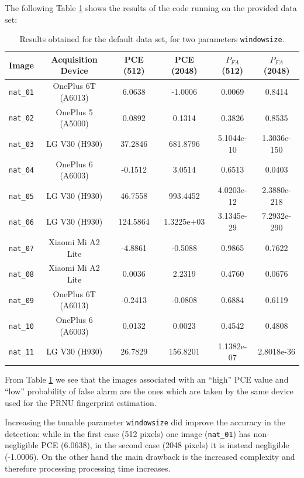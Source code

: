 \documentclass[a4paper, 11pt]{article}
\begin{document}
The following Table \ref{tab:defaultdataset} shows the results of the code running on the provided data set:
\begin{table}[H]
	\centering

	\begin{tabular}{c|c|c|c|c|c}
	Image & Acquisition Device & PCE (512) & PCE (2048) & $P_{FA}$ (512) & $P_{FA}$ (2048) \\
	\hline
	\texttt{nat\_01} & OnePlus 6T (A6013)	& 6.0638	& -1.0006 & 0.0069 & 0.8414 \\
	\texttt{nat\_02} & OnePlus 5 (A5000) 	& 0.0892	& 0.1314 & 0.3826 & 0.8535 \\
	\texttt{nat\_03} & LG V30 (H930) 	& 37.2846	& 681.8796	& 5.1044e-10 & 1.3036e-150\\
	\texttt{nat\_04} & OnePlus 6 (A6003) 	& -0.1512	& 3.0514	& 0.6513 & 0.0403 \\
	\texttt{nat\_05} & LG V30 (H930) 		& 46.7558	& 993.4452 & 4.0203e-12 & 2.3880e-218\\
	\texttt{nat\_06} & LG V30 (H930) 	& 124.5864	& 1.3225e+03 & 3.1345e-29 & 7.2932e-290\\
	\texttt{nat\_07} & Xiaomi Mi A2 Lite	& -4.8861	& -0.5088 & 0.9865 & 0.7622 \\
	\texttt{nat\_08} & Xiaomi Mi A2 Lite 	& 0.0036	& 2.2319 & 0.4760 & 0.0676 \\
	\texttt{nat\_09} & OnePlus 6T (A6013)	& -0.2413	& -0.0808 & 0.6884 & 0.6119\\
	\texttt{nat\_10} & OnePlus 6 (A6003) 	& 0.0132	& 0.0023 & 0.4542 & 0.4808\\
	\texttt{nat\_11} & LG V30 (H930) 		& 26.7829	& 156.8201 & 1.1382e-07 & 2.8018e-36
	\end{tabular}
	\caption{Results obtained for the default data set, for two parameters \texttt{windowsize}.}
	\label{tab:defaultdataset}
\end{table}

From Table \ref{tab:defaultdataset} we see that the images associated with an ``high'' PCE value and ``low'' probability of false alarm are the ones which are taken by the same device used for the PRNU fingerprint estimation.

Increasing the tunable parameter \texttt{windowsize} did improve the accuracy in the detection: while in the first case (512 pixels) one image (\texttt{nat\_01}) has non-negligible PCE (6.0638), in the second case (2048 pixels) it is instead negligible (-1.0006). On the other hand the main drawback is the increased complexity and therefore processing processing time increases.
\end{document}
